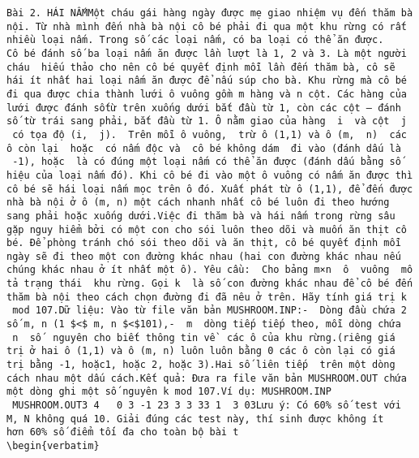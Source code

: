 
\begin{verbatim}
Bài 2. HÁI NẤMMột cháu gái hàng ngày được mẹ giao nhiệm vụ đến thăm bà nội. Từ nhà mình đến nhà bà nội cô bé phải đi qua một khu rừng có rất nhiều loại nấm. Trong số các loại nấm, có ba loại có thể ăn được. Cô bé đánh số ba loại nấm ăn được lần lượt là 1, 2 và 3. Là một người cháu  hiếu thảo cho nên cô bé quyết định mỗi lần đến thăm bà, cô sẽ hái ít nhất hai loại nấm ăn được để nấu súp cho bà. Khu rừng mà cô bé đi qua được chia thành lưới ô vuông gồm m hàng và n cột. Các hàng của lưới được đánh sốtừ trên xuống dưới bắt đầu từ 1, còn các cột – đánh số từ trái sang phải, bắt đầu từ 1. Ô nằm giao của hàng  i  và cột  j  có tọa độ (i,  j).  Trên mỗi ô vuông,  trừ ô (1,1) và ô (m,  n)  các ô còn lại  hoặc  có nấm độc và  cô bé không dám  đi vào (đánh dấu là  -1), hoặc  là có đúng một loại nấm có thể ăn được (đánh dấu bằng số hiệu của loại nấm đó). Khi cô bé đi vào một ô vuông có nấm ăn được thì cô bé sẽ hái loại nấm mọc trên ô đó. Xuất phát từ ô (1,1), để đến được nhà bà nội ở ô (m, n) một cách nhanh nhất cô bé luôn đi theo hướng sang phải hoặc xuống dưới.Việc đi thăm bà và hái nấm trong rừng sâu gặp nguy hiểm bởi có một con cho sói luôn theo dõi và muốn ăn thịt cô bé. Để phòng tránh chó sói theo dõi và ăn thịt, cô bé quyết định mỗi ngày sẽ đi theo một con đường khác nhau (hai con đường khác nhau nếu chúng khác nhau ở ít nhất một ô). Yêu cầu:  Cho bảng m×n  ô  vuông  mô tả trạng thái  khu rừng. Gọi k  là số con đường khác nhau để cô bé đến thăm bà nội theo cách chọn đường đi đã nêu ở trên. Hãy tính giá trị k  mod 107.Dữ liệu: Vào từ file văn bản MUSHROOM.INP:-  Dòng đầu chứa 2 số m, n (1 $<$ m, n $<$101),-  m  dòng tiếp tiếp theo, mỗi dòng chứa  n  số  nguyên cho biết thông tin về  các ô của khu rừng.(riêng giá trị ở hai ô (1,1) và ô (m, n) luôn luôn bằng 0 các ô còn lại có giá trị bằng -1, hoặc1, hoặc 2, hoặc 3).Hai số liên tiếp  trên một dòng cách nhau một dấu cách.Kết quả: Đưa ra file văn bản MUSHROOM.OUT chứa một dòng ghi một số nguyên k mod 107.Ví dụ: MUSHROOM.INP    MUSHROOM.OUT3 4   0 3 -1 23 3 3 33 1  3 03Lưu ý: Có 60% số test với M, N không quá 10. Giải đúng các test này, thí sinh được không ít hơn 60% số điểm tối đa cho toàn bộ bài t
\begin{verbatim}
\end{verbatim}
